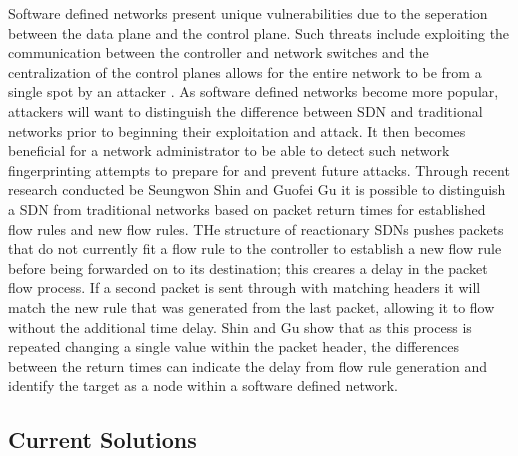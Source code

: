 \documentclass[twocolumn]{article}
\begin{document}
Software defined networks present unique vulnerabilities due to the seperation between the data plane and the control plane. Such threats include exploiting the communication between the controller and network switches and the centralization of the control planes allows for the entire network to be from a single spot by an attacker \cite{kreutz}. As software defined networks become more popular, attackers will want to distinguish the difference between SDN and traditional networks prior to beginning their exploitation and attack. It then becomes beneficial for a network administrator to be able to detect such network fingerprinting attempts to prepare for and prevent future attacks. Through recent research conducted be Seungwon Shin and Guofei Gu \cite{Gu13} it is possible to distinguish a SDN from traditional networks based on packet return times for established flow rules and new flow rules. THe structure of reactionary SDNs pushes packets that do not currently fit a flow rule to the controller to establish a new flow rule before being forwarded on to its destination; this creares a delay in the packet flow process. If a second packet is sent through with matching headers it will match the new rule that was generated from the last packet, allowing it to flow without the additional time delay. Shin and Gu show that as this process is repeated changing a single value within the packet header, the differences between the return times can indicate the delay from flow rule generation and identify the target as a node within a software defined network.

\subsection{Current Solutions}
\end{document}

